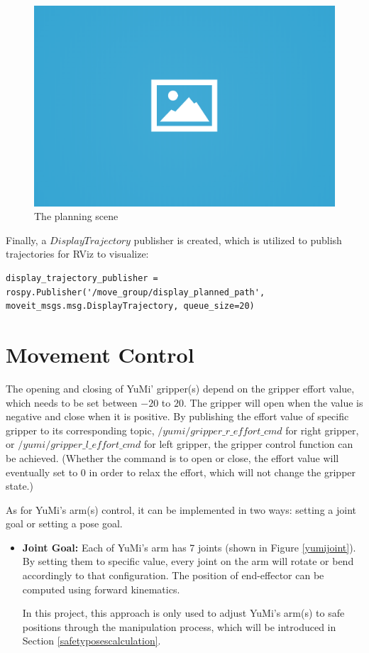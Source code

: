 \begin{figure}[H]
\centering
\includegraphics[width = 0.5\columnwidth]{images/ph.png}
\caption{The planning scene}
\label{scene}
\end{figure}

Finally, a $DisplayTrajectory$ publisher is created, which is utilized to publish trajectories for RViz to visualize:

\begin{verbatim}
display_trajectory_publisher = rospy.Publisher('/move_group/display_planned_path', 	moveit_msgs.msg.DisplayTrajectory, queue_size=20)
\end{verbatim}


\section{Movement Control}
The opening and closing of YuMi' gripper(s) depend on the gripper effort value, which needs to be set between $-20$ to $20$. The gripper will open when the value is negative and close when it is positive. By publishing the effort value of specific gripper to its corresponding topic, $/yumi/gripper\_r\_effort\_cmd$ for right gripper, or $/yumi/gripper\_l\_effort\_cmd$ for left gripper, the gripper control function can be achieved. (Whether the command is to open or close, the effort value will eventually set to 0 in order to relax the effort, which will not change the gripper state.)

As for YuMi's arm(s) control, it can be implemented in two ways: setting a joint goal or setting a pose goal.

\begin{itemize}
    \item \textbf{Joint Goal:} Each of YuMi's arm has 7 joints (shown in Figure \ref{yumijoint}). By setting them to specific value, every joint on the arm will rotate or bend accordingly to that configuration. The position of end-effector can be computed using forward kinematics.
    
    In this project, this approach is only used to adjust YuMi's arm(s) to safe positions through the manipulation process, which will be introduced in Section \ref{safetyposescalculation}.
\end{itemize}

